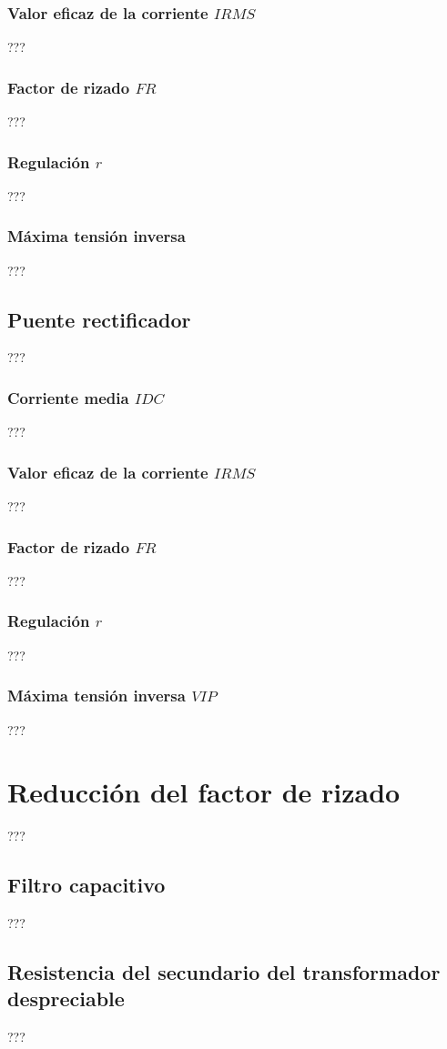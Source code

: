 \subsubsection{Valor eficaz de la corriente $IRMS$}
???
\subsubsection{Factor de rizado $FR$}
???
\subsubsection{Regulación $r$}
???
\subsubsection{Máxima tensión inversa}
???
\subsection{Puente rectificador}
???
\subsubsection{Corriente media $IDC$}
???
\subsubsection{Valor eficaz de la corriente $IRMS$}
???
\subsubsection{Factor de rizado $FR$}
???
\subsubsection{Regulación $r$}
???
\subsubsection{Máxima tensión inversa $VIP$}
???
\section{Reducción del factor de rizado}
???
\subsection{Filtro capacitivo}
???
\subsection{Resistencia del secundario del transformador despreciable}
???
